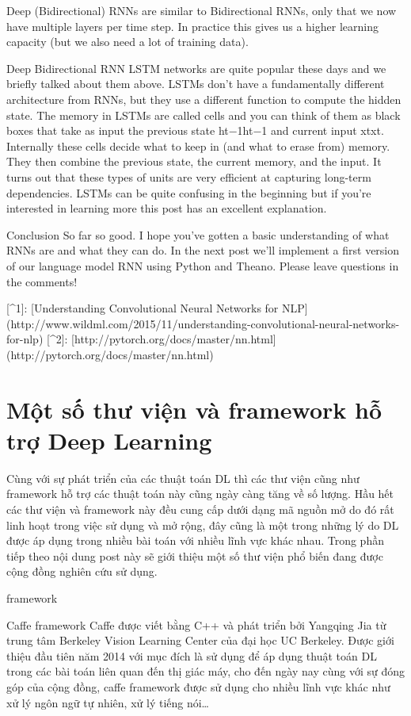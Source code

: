 Deep (Bidirectional) RNNs are similar to Bidirectional RNNs, only that we now have multiple layers per time step. In practice this gives us a higher learning capacity (but we also need a lot of training data).

Deep Bidirectional RNN LSTM networks are quite popular these days and we briefly talked about them above. LSTMs don’t have a fundamentally different architecture from RNNs, but they use a different function to compute the hidden state. The memory in LSTMs are called cells and you can think of them as black boxes that take as input the previous state ht−1ht−1 and current input xtxt. Internally these cells decide what to keep in (and what to erase from) memory. They then combine the previous state, the current memory, and the input. It turns out that these types of units are very efficient at capturing long-term dependencies. LSTMs can be quite confusing in the beginning but if you’re interested in learning more this post has an excellent explanation.

Conclusion
So far so good. I hope you’ve gotten a basic understanding of what RNNs are and what they can do. In the next post we’ll implement a first version of our language model RNN using Python and Theano. Please leave questions in the comments!


[^1]: [Understanding Convolutional Neural Networks for NLP](http://www.wildml.com/2015/11/understanding-convolutional-neural-networks-for-nlp)
[^2]: [http://pytorch.org/docs/master/nn.html](http://pytorch.org/docs/master/nn.html)

\section{Một số thư viện và framework hỗ trợ Deep Learning}

Cùng với sự phát triển của các thuật toán DL thì các thư viện cũng như framework hỗ trợ các thuật toán này cũng ngày càng tăng về số lượng. Hầu hết các thư viện và framework này đều cung cấp dưới dạng mã nguồn mở do đó rất linh hoạt trong việc sử dụng và mở rộng, đây cũng là một trong những lý do DL được áp dụng trong nhiều bài toán với nhiều lĩnh vực khác nhau. Trong phần tiếp theo nội dung post này sẽ giới thiệu một số thư viện phổ biến đang được cộng đồng nghiên cứu sử dụng.

framework

Caffe framework
Caffe được viết bằng C++ và phát triển bởi Yangqing Jia từ trung tâm Berkeley Vision Learning Center của đại học UC Berkeley. Được giới thiệu đầu tiên năm 2014 với mục đích là sử dụng để áp dụng thuật toán DL trong các bài toán liên quan đến thị giác máy, cho đến ngày nay cùng với sự đóng góp của cộng đồng, caffe framework được sử dụng cho nhiều lĩnh vực khác như xử lý ngôn ngữ tự nhiên, xử lý tiếng nói…

